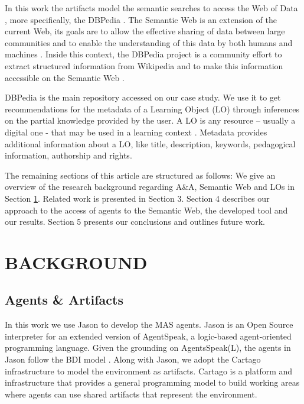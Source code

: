 \documentclass[a4paper,twoside]{article}
\begin{document}
In this work the artifacts model the semantic searches to access the Web of Data \cite{refOPQ}, more specifically, the DBPedia \cite{refXYZ}. The Semantic Web is an extension of the current Web, its goals are to allow the effective sharing of data between large communities and to enable the understanding of this data by both humans and machines \cite{ref53,ref54}. Inside this context, the DBPedia project is a community effort to extract structured information from Wikipedia and to make this information accessible on the Semantic Web \cite{refXYZ}.

DBPedia is the main repository accessed on our case study. We use it to get recommendations for the metadata of a Learning Object (LO) through inferences on the partial knowledge provided by the user. A LO is any resource – usually a digital one - that may be used in a learning context \cite{ref40}. Metadata provides additional information about a LO, like title, description, keywords, pedagogical information, authorship and rights.

The remaining sections of this article are structured as follows: We give an overview of the research background regarding A\&A, Semantic Web and LOs in Section  \ref{sec:background}. Related work is presented in Section 3. Section 4 describes our approach to the access of agents to the Semantic Web, the developed tool and our results. Section 5 presents our conclusions and outlines future work.


\section{\uppercase{Background}}
\label{sec:background}

\subsection{Agents \& Artifacts}

\noindent In this work we use Jason to develop the MAS agents. Jason \cite{ref35} is an Open Source interpreter for an extended version of AgentSpeak, a logic-based agent-oriented programming language. Given the grounding on AgentsSpeak(L), the agents in Jason follow the BDI model \cite{ref20}. Along with Jason, we adopt the Cartago\cite{refCartago} infrastructure to model the environment as artifacts. Cartago is a platform and infrastructure that provides a general programming model to build working areas where agents can use shared artifacts that represent the environment.
\end{document}
